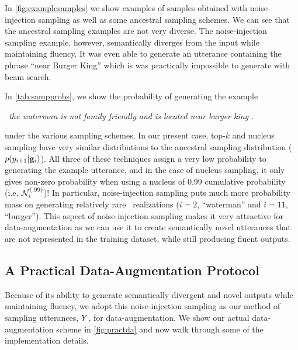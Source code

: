 In \autoref{fig:examplesamples} we show examples of samples obtained with
noise-injection sampling as well as some ancestral sampling schemes.  We can
see that the ancestral sampling examples are not very diverse.  The
noise-injection sampling example, however, semantically diverges from the input
while maintaining fluency. It was even able to generate an utterance containing
the phrase ``near Burger King'' which is was practically impossible to generate
with beam search.

In \autoref{tab:sampprobs}, we show the probability of generating the example

\begin{center}
\textit{\starttok~the waterman is not family friendly and is located near burger king . \stoptok}\end{center}

\noindent under the various sampling schemes. In our present case, top-$k$ and
nucleus sampling have very similar distributions to the ancestral sampling
distribution ($p(y_{i+1}|\mathbf{g}_i)$). All three of these
techniques assign a very low probability to generating the example utterance,
and in the case of nucleus sampling, it only gives non-zero probability when
using a nucleus of 0.99 cumulative probability (i.e. ${\mathcal{N}}_{i}^{(.99)}$)!
In particular, noise-injection sampling puts much more probability mass on
generating relatively rare \attributevalue~realizations ($i=2$, ``waterman''
and $i=11$, ``burger''). This aspect of noise-injection sampling makes it very
attractive for data-augmentation as we can use it to create semantically novel
utterances that are not represented in the training dataset, while still
producing fluent outputs.



\subsection{A Practical Data-Augmentation Protocol}
\label{sec:daprotos}



Because of its ability to generate semantically divergent and novel outputs
while maintaining fluency, we adopt this noise-injection sampling as our method
of sampling utterances, $Y$, for data-augmentation. We show our actual
data-augmentation scheme in \autoref{fig:practda} and now walk through some of
the implementation details.

